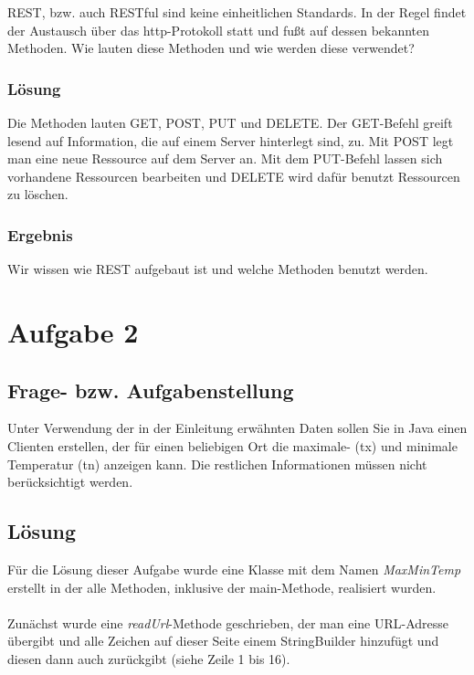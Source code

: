 REST, bzw. auch RESTful sind keine einheitlichen Standards. In der Regel findet der Austausch über das http-Protokoll statt und fußt auf dessen bekannten Methoden. Wie lauten diese Methoden und wie werden diese verwendet?

\subsubsection{Lösung}

Die Methoden lauten GET, POST, PUT und DELETE. Der GET-Befehl greift lesend auf Information, die auf einem Server hinterlegt sind, zu. Mit POST legt man eine neue Ressource auf dem Server an. Mit dem PUT-Befehl lassen sich vorhandene Ressourcen bearbeiten und DELETE wird dafür benutzt Ressourcen zu löschen. \cite{[6]}

\subsubsection{Ergebnis}

Wir wissen wie REST aufgebaut ist und welche Methoden benutzt werden.

\section{Aufgabe 2}\cite{[1]}

\subsection{Frage- bzw. Aufgabenstellung}

Unter Verwendung der in der Einleitung erwähnten Daten sollen Sie in Java einen Clienten erstellen, der für einen beliebigen Ort die maximale- (tx) und minimale Temperatur (tn) anzeigen kann. Die restlichen Informationen müssen nicht berücksichtigt werden.

\subsection{Lösung}

Für die Lösung dieser Aufgabe wurde eine Klasse mit dem Namen \textit{MaxMinTemp} erstellt in der alle Methoden, inklusive der main-Methode, realisiert wurden. \\
\\
Zunächst wurde eine \textit{readUrl}-Methode geschrieben, der man eine URL-Adresse übergibt und alle Zeichen auf dieser Seite einem StringBuilder hinzufügt und diesen dann auch zurückgibt (siehe Zeile 1 bis 16).

